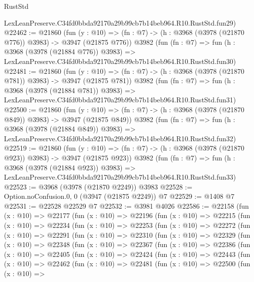 \begin{lexlean}{RustStd}
\begin{coremodule}
    LexLeanPreserve.C34fd0bbda92170a29b99cb7b14beb964.R10.RustStd.fun29)
@22462 := @21860
    (fun (y : @10) => (fn : @7) -> (h : @3968 (@3978 (@21870 @776)) @3983) -> @3947 (@21875 @776))
    @3982
    (fun (fn : @7) =>
    fun (h : @3968 (@3978 (@21884 @776)) @3983) =>
    LexLeanPreserve.C34fd0bbda92170a29b99cb7b14beb964.R10.RustStd.fun30)
@22481 := @21860
    (fun (y : @10) => (fn : @7) -> (h : @3968 (@3978 (@21870 @781)) @3983) -> @3947 (@21875 @781))
    @3982
    (fun (fn : @7) =>
    fun (h : @3968 (@3978 (@21884 @781)) @3983) =>
    LexLeanPreserve.C34fd0bbda92170a29b99cb7b14beb964.R10.RustStd.fun31)
@22500 := @21860
    (fun (y : @10) => (fn : @7) -> (h : @3968 (@3978 (@21870 @849)) @3983) -> @3947 (@21875 @849))
    @3982
    (fun (fn : @7) =>
    fun (h : @3968 (@3978 (@21884 @849)) @3983) =>
    LexLeanPreserve.C34fd0bbda92170a29b99cb7b14beb964.R10.RustStd.fun32)
@22519 := @21860
    (fun (y : @10) => (fn : @7) -> (h : @3968 (@3978 (@21870 @923)) @3983) -> @3947 (@21875 @923))
    @3982
    (fun (fn : @7) =>
    fun (h : @3968 (@3978 (@21884 @923)) @3983) =>
    LexLeanPreserve.C34fd0bbda92170a29b99cb7b14beb964.R10.RustStd.fun33)
@22523 := @3968 (@3978 (@21870 @2249)) @3983
@22528 := Option.noConfusion.{0, 0} (@3947 (@21875 @2249)) @7
@22529 := @1408 @7
@22531 := @22528 @22529 @7
@22532 := @3981 @4026
@22586 := @22158
    (fun (x : @10) =>
    @22177
      (fun (x : @10) =>
      @22196
        (fun (x : @10) =>
        @22215
          (fun (x : @10) =>
          @22234
            (fun (x : @10) =>
            @22253
              (fun (x : @10) =>
              @22272
                (fun (x : @10) =>
                @22291
                  (fun (x : @10) =>
                  @22310
                    (fun (x : @10) =>
                    @22329
                      (fun (x : @10) =>
                      @22348
                        (fun (x : @10) =>
                        @22367
                          (fun (x : @10) =>
                          @22386
                            (fun (x : @10) =>
                            @22405
                              (fun (x : @10) =>
                              @22424
                                (fun (x : @10) =>
                                @22443
                                  (fun (x : @10) =>
                                  @22462
                                    (fun (x : @10) =>
                                    @22481
                                      (fun (x : @10) =>
                                      @22500
                                        (fun (x : @10) =>

\end{coremodule}
\end{lexlean}
